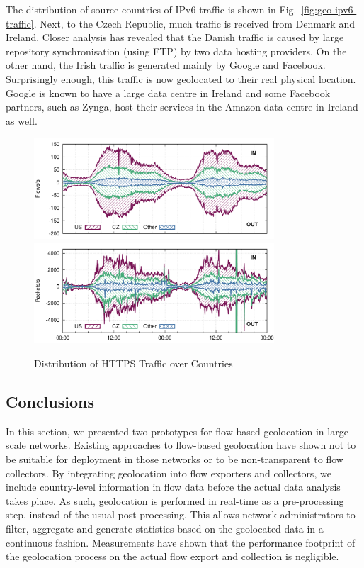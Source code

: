 The distribution of source countries of IPv6 traffic is shown in Fig.~\ref{fig:geo-ipv6-traffic}. Next, to the Czech Republic, much traffic is received from Denmark and Ireland. Closer analysis has revealed that the Danish traffic is caused by large repository synchronisation (using FTP) by two data hosting providers. On the other hand, the Irish traffic is generated mainly by Google and Facebook. Surprisingly enough, this traffic is now geolocated to their real physical location. Google is known to have a large data centre in Ireland and some Facebook partners, such as Zynga, host their services in the Amazon data centre in Ireland as well.

\begin{figure}[!tb]
    \centering
    \includegraphics[width=0.8\textwidth]{figures/paper-geolocation/https/flows}
    \includegraphics[width=0.8\textwidth]{figures/paper-geolocation/https/packets}
    \caption{Distribution of HTTPS Traffic over Countries}
    \label{fig:geo-https-traffic}
\end{figure}

\subsection{Conclusions} \label{subsec:geo-conclusions}

In this section, we presented two prototypes for flow-based geolocation in large-scale networks. Existing approaches to flow-based geolocation have shown not to be suitable for deployment in those networks or to be non-transparent to flow collectors. By integrating geolocation into flow exporters and collectors, we include country-level information in flow data before the actual data analysis takes place. As such, geolocation is performed in real-time as a pre-processing step, instead of the usual post-processing. This allows network administrators to filter, aggregate and generate statistics based on the geolocated data in a continuous fashion. Measurements have shown that the performance footprint of the geolocation process on the actual flow export and collection is negligible.

